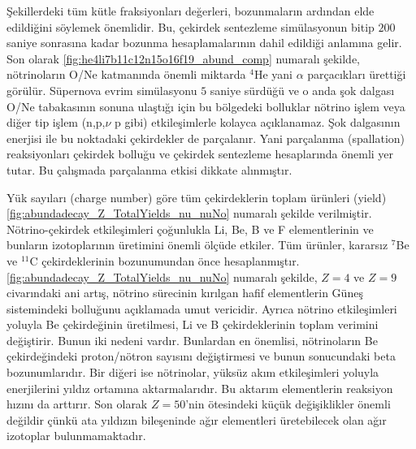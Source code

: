 Şekillerdeki tüm kütle fraksiyonları değerleri, bozunmaların ardından elde edildiğini söylemek önemlidir. Bu, çekirdek sentezleme simülasyonun bitip $200$ saniye sonrasına kadar bozunma hesaplamalarının dahil edildiği anlamına gelir. Son olarak \ref{fig:he4li7b11c12n15o16f19_abund_comp} numaralı şekilde, nötrinoların O/Ne katmanında önemli miktarda $ ^{4} $He yani $ \alpha $ parçacıkları ürettiği görülür. Süpernova evrim simülasyonu $5$ saniye sürdüğü ve o anda şok dalgası O/Ne tabakasının sonuna ulaştığı için bu bölgedeki bolluklar nötrino işlem veya diğer tip işlem (n,p,$\nu$ p gibi) etkileşimlerle kolayca açıklanamaz. Şok dalgasının enerjisi ile bu noktadaki çekirdekler de parçalanır. Yani parçalanma (spallation) reaksiyonları çekirdek bolluğu ve çekirdek sentezleme hesaplarında önemli yer tutar. Bu çalışmada parçalanma etkisi dikkate alınmıştır.

Yük sayıları (charge number) göre tüm çekirdeklerin toplam ürünleri (yield) \ref{fig:abundadecay_Z_TotalYields_nu_nuNo} numaralı şekilde verilmiştir. Nötrino-çekirdek etkileşimleri çoğunlukla Li, Be, B ve F elementlerinin ve bunların izotoplarının üretimini önemli ölçüde etkiler. Tüm ürünler, kararsız $ ^{7} $Be ve $ ^{11} $C çekirdeklerinin bozunumundan önce hesaplanmıştır. \ref{fig:abundadecay_Z_TotalYields_nu_nuNo} numaralı şekilde, $ Z=4 $ ve $ Z=9 $ civarındaki ani artış, nötrino sürecinin kırılgan hafif elementlerin Güneş sistemindeki bolluğunu açıklamada umut vericidir. Ayrıca nötrino etkileşimleri yoluyla Be çekirdeğinin üretilmesi, Li ve B çekirdeklerinin toplam verimini değiştirir. Bunun iki nedeni vardır. Bunlardan en önemlisi, nötrinoların Be çekirdeğindeki proton/nötron sayısını değiştirmesi ve bunun sonucundaki beta bozunumlarıdır. Bir diğeri ise nötrinolar, yüksüz akım etkileşimleri yoluyla enerjilerini yıldız ortamına aktarmalarıdır. Bu aktarım elementlerin reaksiyon hızını da arttırır. Son olarak $ Z=50 $'nin ötesindeki küçük değişiklikler önemli değildir çünkü ata yıldızın bileşeninde ağır elementleri üretebilecek olan ağır izotoplar bulunmamaktadır.


